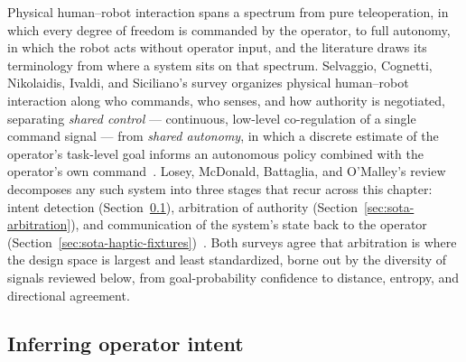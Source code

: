 \documentclass[12pt,a4paper,twoside,openright]{report}
\begin{document}
Physical human--robot interaction spans a spectrum from pure teleoperation, in which every degree of freedom is commanded by the operator, to full autonomy, in which the robot acts without operator input, and the literature draws its terminology from where a system sits on that spectrum. Selvaggio, Cognetti, Nikolaidis, Ivaldi, and Siciliano's survey organizes physical human--robot interaction along who commands, who senses, and how authority is negotiated, separating \emph{shared control} --- continuous, low-level co-regulation of a single command signal --- from \emph{shared autonomy}, in which a discrete estimate of the operator's task-level goal informs an autonomous policy combined with the operator's own command~\cite{selvaggio2021autonomy}. Losey, McDonald, Battaglia, and O'Malley's review decomposes any such system into three stages that recur across this chapter: intent detection (Section~\ref{sec:sota-intent}), arbitration of authority (Section~\ref{sec:sota-arbitration}), and communication of the system's state back to the operator (Section~\ref{sec:sota-haptic-fixtures})~\cite{losey2018review}. Both surveys agree that arbitration is where the design space is largest and least standardized, borne out by the diversity of signals reviewed below, from goal-probability confidence to distance, entropy, and directional agreement.

\subsection{Inferring operator intent}
\label{sec:sota-intent}
\end{document}
